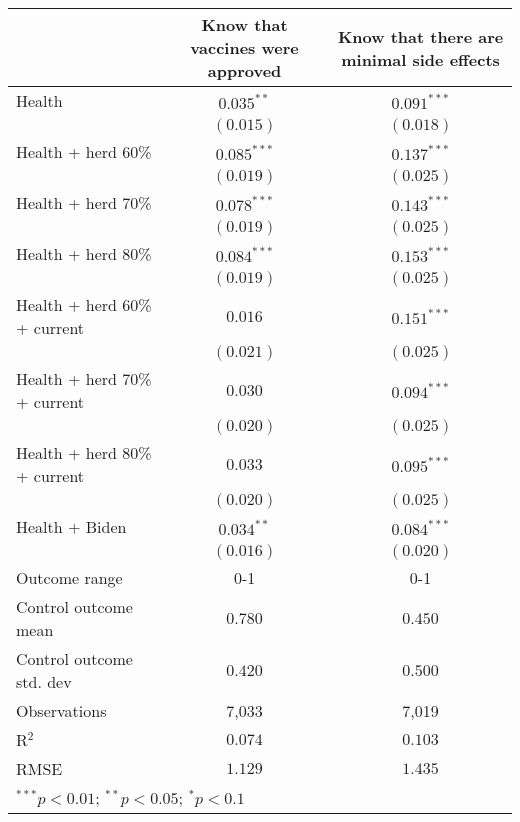 \begin{table}
\begin{center}
\begin{tabular}{l c c}
\hline
 & Know that vaccines were approved & Know that there are minimal side effects \\
\hline
Health                       & $0.035^{**}$  & $0.091^{***}$ \\
                             & $(0.015)$     & $(0.018)$     \\
Health + herd 60\%           & $0.085^{***}$ & $0.137^{***}$ \\
                             & $(0.019)$     & $(0.025)$     \\
Health + herd 70\%           & $0.078^{***}$ & $0.143^{***}$ \\
                             & $(0.019)$     & $(0.025)$     \\
Health + herd 80\%           & $0.084^{***}$ & $0.153^{***}$ \\
                             & $(0.019)$     & $(0.025)$     \\
Health + herd 60\% + current & $0.016$       & $0.151^{***}$ \\
                             & $(0.021)$     & $(0.025)$     \\
Health + herd 70\% + current & $0.030$       & $0.094^{***}$ \\
                             & $(0.020)$     & $(0.025)$     \\
Health + herd 80\% + current & $0.033$       & $0.095^{***}$ \\
                             & $(0.020)$     & $(0.025)$     \\
Health + Biden               & $0.034^{**}$  & $0.084^{***}$ \\
                             & $(0.016)$     & $(0.020)$     \\
\hline
Outcome range                & 0-1           & 0-1           \\
Control outcome mean         & $0.780$       & $0.450$       \\
Control outcome std. dev     & $0.420$       & $0.500$       \\
Observations                 & 7,033         & 7,019         \\
R$^{2}$                      & $0.074$       & $0.103$       \\
RMSE                         & $1.129$       & $1.435$       \\
\hline
\multicolumn{3}{l}{\scriptsize{$^{***}p<0.01$; $^{**}p<0.05$; $^{*}p<0.1$}}
\end{tabular}
\caption{}
\label{table:Tables and Figures/SI_table2_manip_B}
\end{center}
\end{table}
